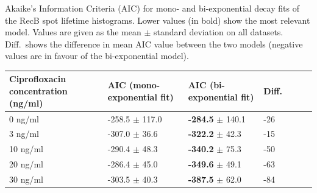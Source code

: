 \begin{supptable}[htbp]
    \centering
    \caption{Akaike's Information Criteria (AIC) for mono- and bi-exponential decay fits of the RecB spot lifetime histograms. Lower values (in bold) show the most relevant model. Values are given as the mean $\pm$ standard deviation on all datasets. Diff.\ shows the difference in mean AIC value between the two models (negative values are in favour of the bi-exponential model).}
    \begin{tabular}{lllllll}
        \toprule
        Ciprofloxacin concentration (ng/ml) & AIC (mono-exponential fit) & AIC (bi-exponential fit) & Diff. \\
        \midrule
        0 ng/ml & -258.5 $\pm$ 117.0 & \textbf{-284.5} $\pm$ 140.1 & -26 \\
        3 ng/ml & -307.0 $\pm$ 36.6 & \textbf{-322.2} $\pm$ 42.3 & -15 \\
        10 ng/ml & -290.4 $\pm$ 48.3 & \textbf{-340.2} $\pm$ 75.3 & -50 \\
        20 ng/ml & -286.4 $\pm$ 45.0 & \textbf{-349.6} $\pm$ 49.1 & -63 \\
        30 ng/ml & -303.5 $\pm$ 40.3 & \textbf{-387.5} $\pm$ 62.0 & -84 \\
        \bottomrule
    \end{tabular}\label{SItab:AIC}
\end{supptable}

